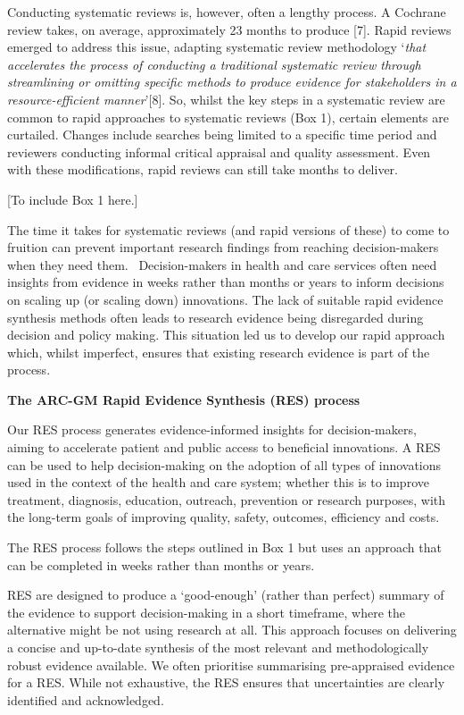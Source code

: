 \documentclass[
  letterpaper,
  DIV=11,
  numbers=noendperiod]{scrreprt}
\begin{document}
Conducting systematic reviews is, however, often a lengthy process. A
Cochrane review takes, on average, approximately 23 months to produce
{[}7{]}. Rapid reviews emerged to address this issue, adapting
systematic review methodology `\emph{that accelerates the process of
conducting a traditional systematic review through streamlining or
omitting specific methods to produce evidence for stakeholders in a
resource-efficient manner}'{[}8{]}. So, whilst the key steps in a
systematic review are common to rapid approaches to systematic reviews
(Box 1), certain elements are curtailed. Changes include searches being
limited to a specific time period and reviewers conducting informal
critical appraisal and quality assessment. Even with these
modifications, rapid reviews can still take months to deliver.

{[}To include Box 1 here.{]}

The time it takes for systematic reviews (and rapid versions of these)
to come to fruition can prevent important research findings from
reaching decision-makers when they need them.~ Decision-makers in health
and care services often need insights from evidence in weeks rather than
months or years to inform decisions on scaling up (or scaling down)
innovations. The lack of suitable rapid evidence synthesis methods often
leads to research evidence being disregarded during decision and policy
making. This situation led us to develop our rapid approach which,
whilst imperfect, ensures that existing research evidence is part of the
process.

\textbf{The ARC-GM Rapid Evidence Synthesis (RES) process}

Our RES process generates evidence-informed insights for
decision-makers, aiming to accelerate patient and public access to
beneficial innovations. A RES can be used to help decision-making on the
adoption of all types of innovations used in the context of the health
and care system; whether this is to improve treatment, diagnosis,
education, outreach, prevention or research purposes, with the long-term
goals of improving quality, safety, outcomes, efficiency and costs.

The RES process follows the steps outlined in Box 1 but uses an approach
that can be completed in weeks rather than months or years.

RES are designed to produce a `good-enough' (rather than perfect)
summary of the evidence to support decision-making in a short timeframe,
where the alternative might be not using research at all. This approach
focuses on delivering a concise and up-to-date synthesis of the most
relevant and methodologically robust evidence available. We often
prioritise summarising pre-appraised evidence for a RES. While not
exhaustive, the RES ensures that uncertainties are clearly identified
and acknowledged.
\end{document}
